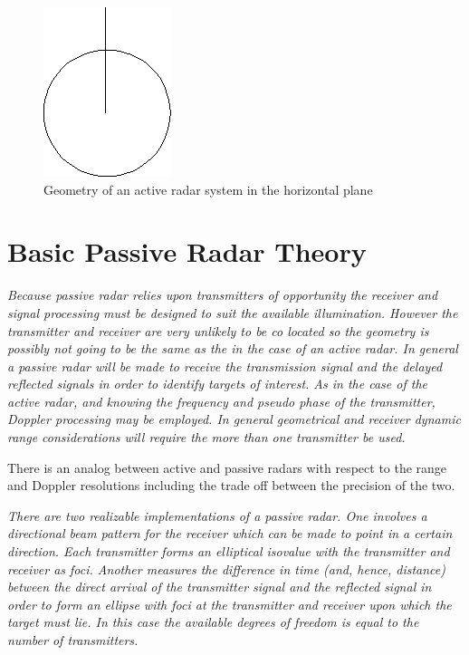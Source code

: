 \documentclass[a4paper]{report}
\newcommand\textstyleEmphasis[1]{\textit{#1}}
\numberwithin{equation}{chapter}
\begin{document}
\begin{figure}
\centering 
\includegraphics{Passive-Weather-Radar-Theory-fig-02.png}
\caption[Geometry of an active radar system in the horizontal plane]{Geometry of an active radar system in the horizontal plane}
\label{fig:02}
\end{figure}

\section{Basic Passive Radar Theory }
\textstyleEmphasis{\textup{Because passive radar relies upon
transmitters of opportunity the receiver and signal processing must be
designed to suit the available illumination. However the transmitter
and receiver are very unlikely to be co located so the geometry is
possibly not going to be the same as the in the case of an active
radar. In general a passive radar will be made to receive the
transmission signal and the delayed reflected signals in order to
identify targets of interest. As in the case of the active radar, and
knowing the frequency and pseudo phase of the transmitter, Doppler
processing may be employed. In general geometrical and receiver dynamic
range considerations will require the more than one transmitter be
used.}} 

\bigskip

There is an analog between active and passive radars with respect to the range and Doppler resolutions including the trade off between the precision of the two.

\bigskip

\textstyleEmphasis{\textup{There are two realizable implementations of a
passive radar. One involves a directional beam pattern
}}\textstyleEmphasis{\textup{for the receiver which can be made to
point in a certain direction. Each transmitter forms an elliptical
isovalue with the transmitter and receiver as foci. Another measures
the difference in time (and, hence, distance) between the direct
arrival of the transmitter signal and the reflected signal in order to
form an ellipse with foci at the transmitter and receiver upon which
the target must lie. In this case the available degrees of freedom is
equal to the number of transmitters.}}
\end{document}
